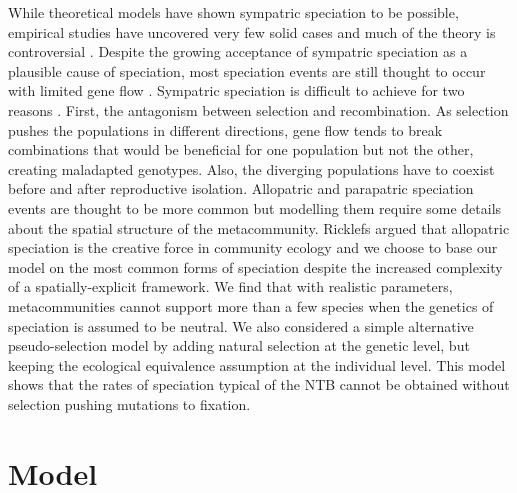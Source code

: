 \documentclass[letterpaper,twocolumn,superscriptaddress,showkeys]{revtex4}
\begin{document}
While theoretical models have shown sympatric speciation to be possible, empirical studies have uncovered very few solid cases \cite{bol07} and much of the theory is controversial \cite{spe05,bar05}. Despite the growing acceptance of sympatric speciation as a plausible cause of speciation, most speciation events are still thought to occur with limited gene flow \cite{coy04,gav05,bol07,fit08}. Sympatric speciation is difficult to achieve for two reasons \cite[p. 127]{coy04}. First, the antagonism between selection and recombination. As selection pushes the populations in different directions, gene flow tends to break combinations that would be beneficial for one population but not the other, creating maladapted genotypes. Also, the diverging populations have to coexist before and after reproductive isolation. Allopatric and parapatric speciation events are thought to be more common but modelling them require some details about the spatial structure of the metacommunity. Ricklefs argued that allopatric speciation is the creative force in community ecology \cite{ric08} and we choose to base our model on the most common forms of speciation despite the increased complexity of a spatially-explicit framework. We find that with realistic parameters, metacommunities cannot support more than a few species when the genetics of speciation is assumed to be neutral. We also considered a simple alternative pseudo-selection model by adding natural selection at the genetic level, but keeping the ecological equivalence assumption at the individual level. This model shows that the rates of speciation typical of the NTB cannot be obtained without selection pushing mutations to fixation.

\section{Model}
\end{document}
